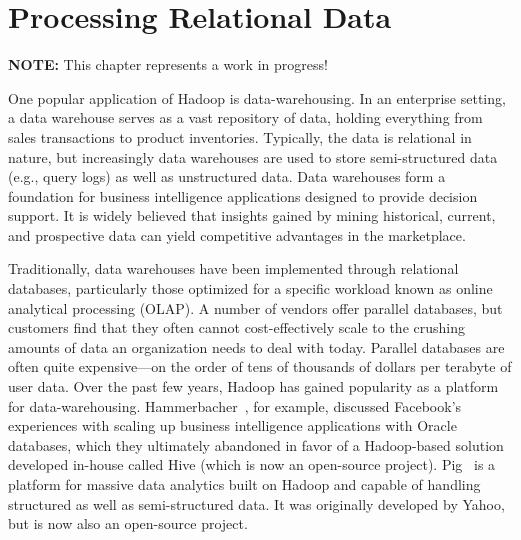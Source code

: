 \chapter{Processing Relational Data}
\label{chapter:db}

\noindent \textbf{NOTE:} This chapter represents a work in progress!

One popular application of Hadoop is data-warehousing.  In an
enterprise setting, a data warehouse serves as a vast repository of
data, holding everything from sales transactions to product
inventories.  Typically, the data is relational in nature, but
increasingly data warehouses are used to store semi-structured data
(e.g., query logs) as well as unstructured data.  Data warehouses form
a foundation for business intelligence applications designed to
provide decision support.  It is widely believed that insights gained
by mining historical, current, and prospective data can yield
competitive advantages in the marketplace.

Traditionally, data warehouses have been implemented through
relational databases, particularly those optimized for a specific
workload known as online analytical processing (OLAP).  A number of
vendors offer parallel databases, but customers find that they often
cannot cost-effectively scale to the crushing amounts of data an
organization needs to deal with today.  Parallel databases are often
quite expensive---on the order of tens of thousands of dollars per
terabyte of user data.  Over the past few years, Hadoop has gained
popularity as a platform for data-warehousing.
Hammerbacher~\cite{Hammerbacher_2009}, for example, discussed
Facebook's experiences with scaling up business intelligence
applications with Oracle databases, which they ultimately abandoned in
favor of a Hadoop-based solution developed in-house called Hive (which
is now an open-source project).  Pig~\cite{Olston_etal_SIGMOD2008} is
a platform for massive data analytics built on Hadoop and capable of
handling structured as well as semi-structured data.  It was
originally developed by Yahoo, but is now also an open-source project.

